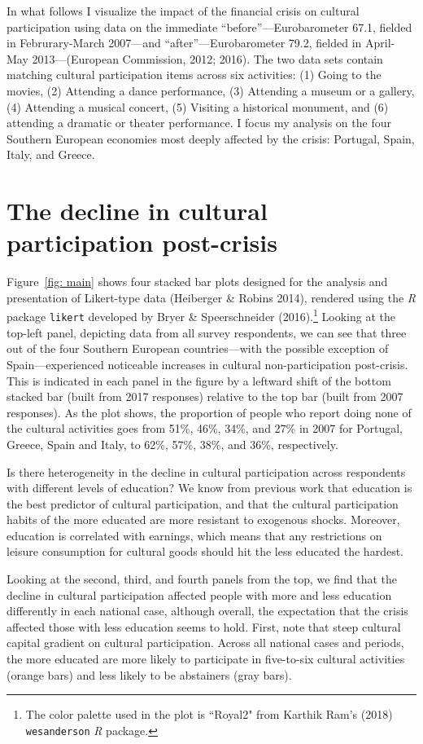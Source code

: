 \documentclass{article}
\begin{document}
In what follows I visualize the impact of the financial crisis on cultural participation using data on the immediate ``before''---Eurobarometer 67.1, fielded in Februrary-March 2007---and ``after''---Eurobarometer 79.2, fielded in April-May 2013---(European Commission, 2012; 2016). The two data sets contain matching cultural participation items across six activities: (1) Going to the movies, (2) Attending a dance performance, (3) Attending a museum or a gallery, (4) Attending a musical concert, (5) Visiting a historical monument, and (6) attending a dramatic or theater performance. I focus my analysis on the four Southern European economies most deeply affected by the crisis: Portugal, Spain, Italy, and Greece. 

\section{The decline in cultural participation post-crisis}
Figure~\ref{fig: main} shows four stacked bar plots designed for the analysis and presentation of Likert-type data (Heiberger \& Robins 2014), rendered using the {\em} {\em R} package \texttt{likert} developed by Bryer \& Speerschneider (2016).\footnote{The color palette used in the plot is ``Royal2" from Karthik Ram's (2018) \texttt{wesanderson} {\em R} package.}  Looking at the top-left panel, depicting data from all survey respondents, we can see that three out of the four Southern European countries---with the possible exception of Spain---experienced noticeable increases in cultural non-participation post-crisis. This is indicated in each panel in the figure by a leftward shift of the bottom stacked bar (built from 2017 responses) relative to the top bar (built from 2007 responses).  As the plot shows, the proportion of people who report doing none of the cultural activities goes from 51\%, 46\%, 34\%, and 27\% in 2007 for Portugal, Greece, Spain and Italy, to 62\%, 57\%, 38\%, and 36\%, respectively. 

Is there heterogeneity in the decline in cultural participation across respondents with different levels of education? We know from previous work that education is the best predictor of cultural participation, and that the cultural participation habits of the more educated are more resistant to exogenous shocks. Moreover, education is correlated with earnings, which means that any restrictions on leisure consumption for cultural goods should hit the less educated the hardest. 

Looking at the second, third, and fourth panels from the top, we find that the decline in cultural participation affected people with more and less education differently in each national case, although overall, the expectation that the crisis affected those with less education seems to hold. First, note that steep cultural capital gradient on cultural participation. Across all national cases and periods, the more educated are more likely to participate in five-to-six cultural activities (orange bars) and less likely to be abstainers (gray bars).  
\end{document}
